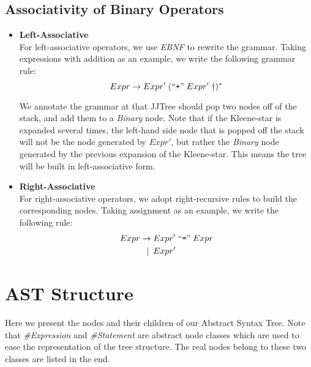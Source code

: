 \documentclass[a4paper,11pt]{article}
\begin{document}
\subsection{Associativity of Binary Operators}
\begin{itemize}
	\item \textbf{Left-Associative} \\
	For left-associative operators, we use \emph{EBNF} to rewrite the grammar.
	Taking expressions with addition as an example, we write the following grammar rule:
	\begin{equation*}
		Expr \rightarrow Expr' \;(\text{``\texttt{+}''}\; Expr' \;\dag)^*
	\end{equation*}

    We annotate the grammar at {\dag} that JJTree should pop two nodes off of the stack, and add them to a \emph{Binary} node.
    Note that if the Kleene-star is expanded several times, the left-hand side node that is popped off the stack will not be the node generated by $Expr'$, but rather the \emph{Binary} node generated by the previous expansion of the Kleene-star.
    This means the tree will be built in left-associative form.

	\item \textbf{Right-Associative} \\
	For right-associative operators, we adopt right-recursive rules to build the corresponding nodes.
	Taking assignment as an example, we write the following rule:
	\begin{align*}
		Expr \rightarrow &\; Expr' \;\text{``\texttt{=}''}\; Expr \\
             \mid \:     &\; Expr'
	\end{align*}
\end{itemize}


\newpage
\appendix
\renewcommand\thesection{Appendix \Alph{section}} %

\section{AST Structure}
Here we present the nodes and their children of our Abstract Syntax Tree. Note that \emph{\#Expression} and \emph{\#Statement} are abstract node classes which are used to ease the representation of the tree structure. The real nodes belong to these two classes are listed in the end.

\hspace{1em}
\end{document}
